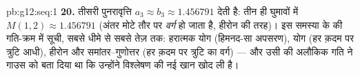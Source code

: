 \begin{solution}{pb:g12:seq:1}
\textbf{20.} तीसरी पुनरावृत्ति $a_3 \approx b_3 \approx 1.456791$ देती है: तीन ही घुमावों में $M(1, 2) \approx
1.456791$ (अंतर
मोटे तौर पर \emph{वर्ग} हो जाता है, हीरोन की तरह)। इस समस्या के  की
गति-क्रम में सूची, सबसे धीमे से सबसे तेज़ तक: हरात्मक योग (हिमनद-सा अपसरण),
 योग (हर क़दम पर त्रुटि आधी), हीरोन और समांतर--गुणोत्तर  (हर
क़दम पर त्रुटि का वर्ग) --- और उसी  की अलौकिक गति ने गाउस को बता दिया था
कि उन्होंने विश्लेषण की नई खान खोद ली है।
\end{solution}

